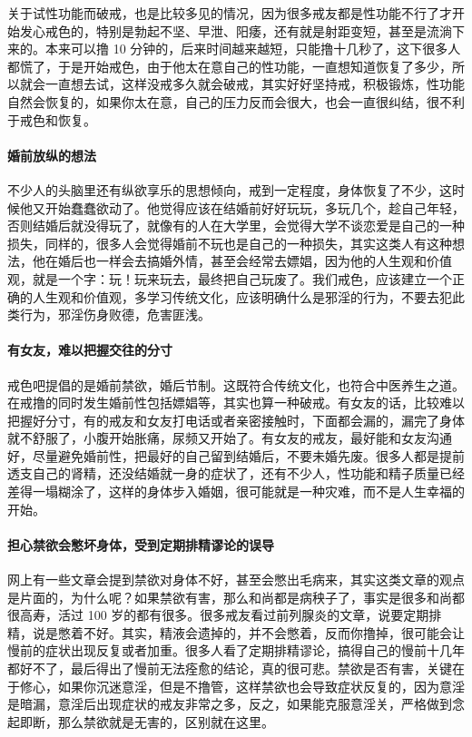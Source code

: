 关于试性功能而破戒，也是比较多见的情况，因为很多戒友都是性功能不行了才开始发心戒色的，特别是勃起不坚、早泄、阳痿，还有就是射距变短，甚至是流淌下来的。本来可以撸 10 分钟的，后来时间越来越短，只能撸十几秒了，这下很多人都慌了，于是开始戒色，由于他太在意自己的性功能，一直想知道恢复了多少，所以就会一直想去试，这样没戒多久就会破戒，其实好好坚持戒，积极锻炼，性功能自然会恢复的，如果你太在意，自己的压力反而会很大，也会一直很纠结，很不利于戒色和恢复。

\paragraph{婚前放纵的想法}

不少人的头脑里还有纵欲享乐的思想倾向，戒到一定程度，身体恢复了不少，这时候他又开始蠢蠢欲动了。他觉得应该在结婚前好好玩玩，多玩几个，趁自己年轻，否则结婚后就没得玩了，就像有的人在大学里，会觉得大学不谈恋爱是自己的一种损失，同样的，很多人会觉得婚前不玩也是自己的一种损失，其实这类人有这种想法，他在婚后也一样会去搞婚外情，甚至会经常去嫖娼，因为他的人生观和价值观，就是一个字：玩！玩来玩去，最终把自己玩废了。我们戒色，应该建立一个正确的人生观和价值观，多学习传统文化，应该明确什么是邪淫的行为，不要去犯此类行为，邪淫伤身败德，危害匪浅。

\paragraph{有女友，难以把握交往的分寸}

戒色吧提倡的是婚前禁欲，婚后节制。这既符合传统文化，也符合中医养生之道。在戒撸的同时发生婚前性包括嫖娼等，其实也算一种破戒。有女友的话，比较难以把握好分寸，有的戒友和女友打电话或者亲密接触时，下面都会漏的，漏完了身体就不舒服了，小腹开始胀痛，尿频又开始了。有女友的戒友，最好能和女友沟通好，尽量避免婚前性，把最好的自己留到结婚后，不要未婚先废。很多人都是提前透支自己的肾精，还没结婚就一身的症状了，还有不少人，性功能和精子质量已经差得一塌糊涂了，这样的身体步入婚姻，很可能就是一种灾难，而不是人生幸福的开始。

\paragraph{担心禁欲会憋坏身体，受到定期排精谬论的误导}

网上有一些文章会提到禁欲对身体不好，甚至会憋出毛病来，其实这类文章的观点是片面的，为什么呢？如果禁欲有害，那么和尚都是病秧子了，事实是很多和尚都很高寿，活过 100 岁的都有很多。很多戒友看过前列腺炎的文章，说要定期排精，说是憋着不好。其实，精液会遗掉的，并不会憋着，反而你撸掉，很可能会让慢前的症状出现反复或者加重。很多人看了定期排精谬论，搞得自己的慢前十几年都好不了，最后得出了慢前无法痊愈的结论，真的很可悲。禁欲是否有害，关键在于修心，如果你沉迷意淫，但是不撸管，这样禁欲也会导致症状反复的，因为意淫是暗漏，意淫后出现症状的戒友非常之多，反之，如果能克服意淫关，严格做到念起即断，那么禁欲就是无害的，区别就在这里。

